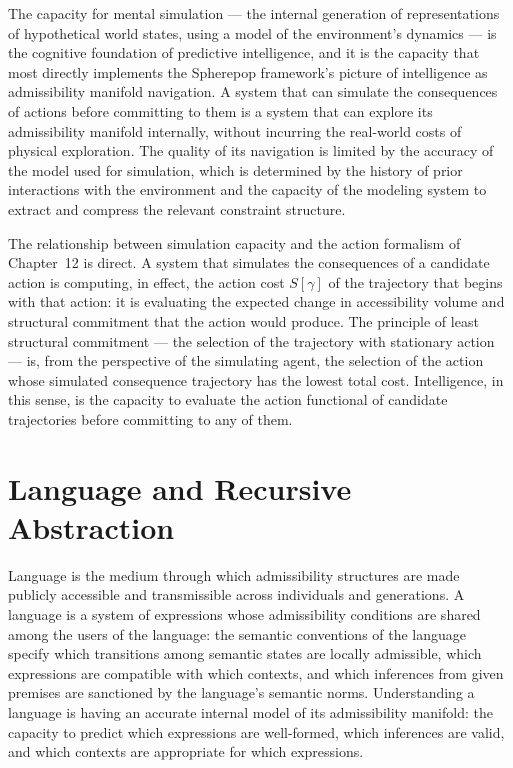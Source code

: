 \documentclass[12pt,openany]{book}
\theoremstyle{plain}
\theoremstyle{definition}
\theoremstyle{remark}
\begin{document}
The capacity for mental simulation — the internal generation of representations of hypothetical world states, using a model of the environment's dynamics — is the cognitive foundation of predictive intelligence, and it is the capacity that most directly implements the Spherepop framework's picture of intelligence as admissibility manifold navigation. A system that can simulate the consequences of actions before committing to them is a system that can explore its admissibility manifold internally, without incurring the real-world costs of physical exploration. The quality of its navigation is limited by the accuracy of the model used for simulation, which is determined by the history of prior interactions with the environment and the capacity of the modeling system to extract and compress the relevant constraint structure.

The relationship between simulation capacity and the action formalism of Chapter~12 is direct. A system that simulates the consequences of a candidate action is computing, in effect, the action cost $S[\gamma]$ of the trajectory that begins with that action: it is evaluating the expected change in accessibility volume and structural commitment that the action would produce. The principle of least structural commitment — the selection of the trajectory with stationary action — is, from the perspective of the simulating agent, the selection of the action whose simulated consequence trajectory has the lowest total cost. Intelligence, in this sense, is the capacity to evaluate the action functional of candidate trajectories before committing to any of them.

\section{Language and Recursive Abstraction}

Language is the medium through which admissibility structures are made publicly accessible and transmissible across individuals and generations. A language is a system of expressions whose admissibility conditions are shared among the users of the language: the semantic conventions of the language specify which transitions among semantic states are locally admissible, which expressions are compatible with which contexts, and which inferences from given premises are sanctioned by the language's semantic norms. Understanding a language is having an accurate internal model of its admissibility manifold: the capacity to predict which expressions are well-formed, which inferences are valid, and which contexts are appropriate for which expressions.
\end{document}
